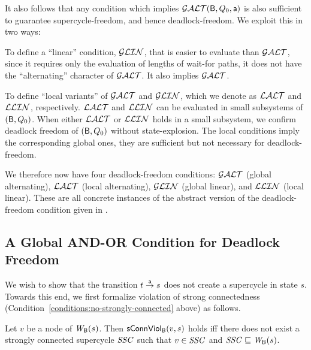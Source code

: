 It also follows that any condition which implies $\GAO(\B, Q_0, \act)$ is also sufficient to guarantee  supercycle-freedom, and
hence deadlock-freedom. We exploit this in two ways:
\bn

\item To define a ``linear'' condition, $\GLin$, that is easier to evaluate than $\GAO$, since it requires only the
evaluation of lengths of wait-for paths, \ie it does not have the ``alternating'' character of $\GAO$.  It also implies $\GAO$.

\item To define ``local variants'' of $\GAO$ and $\GLin$, which we denote as $\LAO$ and $\LLin$, respectively.  $\LAO$ and $\LLin$ can be evaluated in
  small subsystems of $(\B, Q_0)$. When either $\LAO$ or $\LLin$ holds in a small subsystem, we confirm deadlock freedom of $(\B, Q_0)$ without
  state-explosion. The local conditions imply the corresponding global ones, \ie they are sufficient but not necessary for deadlock-freedom.

\en
%
We therefore now have four deadlock-freedom conditions: $\GAO$ (global alternating), $\LAO$ (local alternating), $\GLin$ (global linear), and $\LLin$
(local linear). These are all concrete instances of the abstract version of the deadlock-freedom condition given in .





   \subsection{A Global AND-OR Condition for Deadlock Freedom}
   \label{s:global.ANDOR}
%   

%

We wish to show that the transition $t \goesto[\act] s$
does not create a supercycle in state $s$.
Towards this end, we first formalize violation of strong connectedness
(Condition~\ref{conditions:no-strongly-connected} above) as follows.

\begin{definition}
\label{def:sConn.violation}
\label{defn:sConn.violation}
 Let $v$ be a node of $\wfg{\B}{s}$.   Then $\connViol{v}{s}$ holds iff there does not exist a 
strongly connected supercycle $\SSC$ such that $v \in \SSC$ and $\SSC \subg \wfg{\B}{s}$.
\end{definition}



